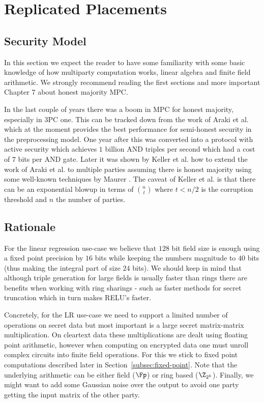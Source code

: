 \section{Replicated Placements}


\subsection{Security Model}
In this section we expect the reader to have some familiarity with some basic
knowledge of how multiparty computation works, linear algebra and finite
field arithmetic. We strongly recommend reading the first sections
\cite{evans2017pragmatic} and more important Chapter 7 about honest majority
MPC.

In the last couple of years there was a boom in MPC for honest majority,
especially in 3PC one. This can be tracked down from the work of Araki et al.
\cite{CCS:AFLNO16} which at the moment provides the best performance for
semi-honest security in the preprocessing model. One year after this was
converted into a protocol with active security which achieves $1$ billion AND
triples per second \cite{SP:ABFLLN17} which had a cost of $7$ bits per AND
gate. Later it was shown by Keller et al. \cite{SCN:KRSW18} how to extend the
work of Araki et al. \cite{CCS:AFLNO16} to multiple parties assuming there is
honest majority using some well-known techniques by Maurer
\cite{SCN:Maurer02}. The caveat of Keller et al. \cite{SCN:KRSW18} is that
there can be an exponential blowup in terms of $n \choose t$ where $t<n/2$ is
the corruption threshold and $n$ the number of parties.


\subsection{Rationale}

For the linear regression use-case we believe that $128$ bit field size is
enough using a fixed point precision by $16$ bits while keeping the numbers
magnitude to $40$ bits (thus making the integral part of size $24$ bits). We
should keep in mind that although triple generation for large fields is
usually faster than rings there are benefits when working with ring sharings
- such as faster methods for secret truncation which in turn makes RELU's
faster.

Concretely, for the LR use-case we need to support a limited number of
operations on secret data but most important is a large secret matrix-matrix
multiplication. On cleartext data these multiplications are dealt using
floating point arithmetic, however when computing on encrypted data one must
unroll complex circuits into finite field operations. For this we stick to
fixed point computations described later in Section~\ref{subsec:fixed-point}.
Note that the underlying arithmetic can be either field ($\Fp$) or ring based
($\Z_{2^k}$). Finally, we might want to add some Gaussian noise over the
output to avoid one party getting the input matrix of the other party.

